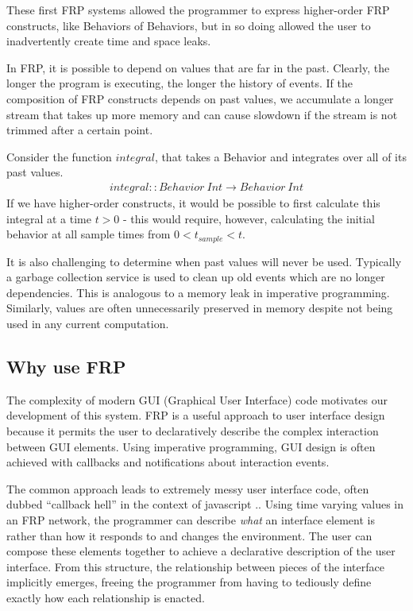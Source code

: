 \documentclass[twocolumn,11pt,english]{article}
\begin{document}
These first FRP systems allowed the programmer to express higher-order FRP constructs, like Behaviors of Behaviors, but in so doing allowed the user to inadvertently create time and space leaks. 

In FRP, it is possible to depend on values that are far in the past. Clearly, the longer the program is executing, the longer the history of events. If the composition of FRP constructs depends on past values, we accumulate a longer stream that takes up more memory and can cause slowdown if the stream is not trimmed after a certain point. 

Consider the function $integral$, that takes a Behavior and integrates over all of its past values. 
\begin{align*}
  integral :: Behavior~Int \rightarrow Behavior~Int
\end{align*}
If we have higher-order constructs, it would be possible to first calculate this integral at a time $t > 0$ - this would require, however, calculating the initial behavior at all sample times from $0 < t_{sample} < t$. 

It is also challenging to determine when past values will never be used. Typically a garbage collection service is used to clean up old events which are no longer dependencies. This is analogous to a memory leak in imperative programming. Similarly, values are often unnecessarily preserved in memory despite not being used in any current computation. 

\subsection{Why use FRP}
 The complexity of modern GUI (Graphical User Interface) code motivates our development of this system. FRP is a useful approach to user interface design because it permits the user to declaratively describe the complex interaction between GUI elements. Using imperative programming, GUI design is often achieved with callbacks and notifications about interaction events. 

The common approach leads to extremely messy user interface code, often dubbed ``callback hell'' in the context of javascript \cite{czaplicki2013asynchronous}.. 
Using time varying values in an FRP network, the programmer can describe \textit{what} an interface element is rather than how it responds to and changes the environment. The user can compose these elements together to achieve a declarative description of the user interface. From this structure, the relationship between pieces of the interface implicitly emerges, freeing the programmer from having to tediously define exactly how each relationship is enacted.
\end{document}
